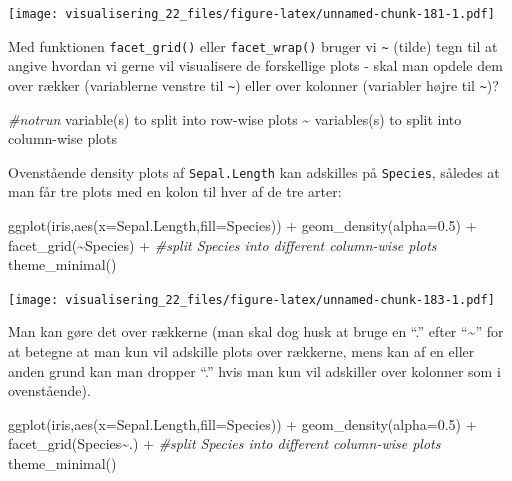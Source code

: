 \documentclass[
]{book}
\newenvironment{Shaded}{\begin{snugshade}}{\end{snugshade}}
\newcommand{\AttributeTok}[1]{\textcolor[rgb]{0.77,0.63,0.00}{#1}}
\newcommand{\CommentTok}[1]{\textcolor[rgb]{0.56,0.35,0.01}{\textit{#1}}}
\newcommand{\FloatTok}[1]{\textcolor[rgb]{0.00,0.00,0.81}{#1}}
\newcommand{\FunctionTok}[1]{\textcolor[rgb]{0.00,0.00,0.00}{#1}}
\newcommand{\NormalTok}[1]{#1}
\newcommand{\SpecialCharTok}[1]{\textcolor[rgb]{0.00,0.00,0.00}{#1}}
\begin{document}
\texttt{[image: visualisering\_22\_files/figure-latex/unnamed-chunk-181-1.pdf]}

Med funktionen \texttt{facet\_grid()} eller \texttt{facet\_wrap()} bruger vi \texttt{\textasciitilde{}} (tilde) tegn til at angive hvordan vi gerne vil visualisere de forskellige plots - skal man opdele dem over rækker (variablerne venstre til \texttt{\textasciitilde{}}) eller over kolonner (variabler højre til \texttt{\textasciitilde{}})?

\begin{Shaded}
\begin{Highlighting}[]
\CommentTok{\#notrun}
\FunctionTok{variable}\NormalTok{(s) to split into row}\SpecialCharTok{{-}}\NormalTok{wise plots }\SpecialCharTok{\textasciitilde{}} \FunctionTok{variables}\NormalTok{(s) to split into column}\SpecialCharTok{{-}}\NormalTok{wise plots}
\end{Highlighting}
\end{Shaded}

Ovenstående density plots af \texttt{Sepal.Length} kan adskilles på \texttt{Species}, således at man får tre plots med en kolon til hver af de tre arter:

\begin{Shaded}
\begin{Highlighting}[]
\FunctionTok{ggplot}\NormalTok{(iris,}\FunctionTok{aes}\NormalTok{(}\AttributeTok{x=}\NormalTok{Sepal.Length,}\AttributeTok{fill=}\NormalTok{Species)) }\SpecialCharTok{+} 
  \FunctionTok{geom\_density}\NormalTok{(}\AttributeTok{alpha=}\FloatTok{0.5}\NormalTok{) }\SpecialCharTok{+} 
  \FunctionTok{facet\_grid}\NormalTok{(}\SpecialCharTok{\textasciitilde{}}\NormalTok{Species) }\SpecialCharTok{+} \CommentTok{\#split Species into different column{-}wise plots}
  \FunctionTok{theme\_minimal}\NormalTok{()}
\end{Highlighting}
\end{Shaded}

\texttt{[image: visualisering\_22\_files/figure-latex/unnamed-chunk-183-1.pdf]}

Man kan gøre det over rækkerne (man skal dog husk at bruge en ``.'' efter ``\textasciitilde{}'' for at betegne at man kun vil adskille plots over rækkerne, mens kan af en eller anden grund kan man dropper ``.'' hvis man kun vil adskiller over kolonner som i ovenstående).

\begin{Shaded}
\begin{Highlighting}[]
\FunctionTok{ggplot}\NormalTok{(iris,}\FunctionTok{aes}\NormalTok{(}\AttributeTok{x=}\NormalTok{Sepal.Length,}\AttributeTok{fill=}\NormalTok{Species)) }\SpecialCharTok{+} 
  \FunctionTok{geom\_density}\NormalTok{(}\AttributeTok{alpha=}\FloatTok{0.5}\NormalTok{) }\SpecialCharTok{+} 
  \FunctionTok{facet\_grid}\NormalTok{(Species}\SpecialCharTok{\textasciitilde{}}\NormalTok{.) }\SpecialCharTok{+} \CommentTok{\#split Species into different column{-}wise plots}
  \FunctionTok{theme\_minimal}\NormalTok{()}
\end{Highlighting}
\end{Shaded}
\end{document}
